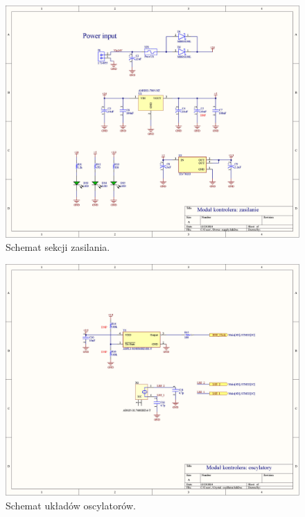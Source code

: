 \begin{figure}
    \begin{center}
        \includegraphics[width = 21cm]{zalaczniki/kontroler/Kontroler_Strona_04.jpg}
        \caption{Schemat sekcji zasilania.}
    \end{center}
\end{figure}

\begin{figure}
    \begin{center}
        \includegraphics[width = 21cm]{zalaczniki/kontroler/Kontroler_Strona_05.jpg}
        \caption{Schemat układów oscylatorów.}
    \end{center}
\end{figure}

